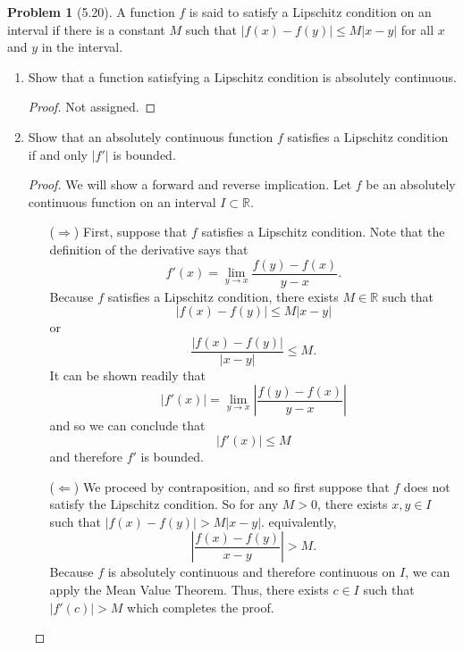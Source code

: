 \documentclass[12pt]{article}
\newcommand{\R}{\mathbb{R}}
\newcommand{\abs}[1]{\left\lvert #1 \right\rvert}
\theoremstyle{definition}
\newtheorem{problem}{Problem}
\begin{document}
\begin{problem}[5.20] 
  A function \( f \) is said to satisfy a Lipschitz condition on an interval if there is a constant \( M \) such that \( \abs{f(x) - f(y)} \leq M \abs{x - y} \) for all \( x \) and \( y \) in the interval. 
  \begin{enumerate}[label = (\alph{*})]
    \item Show that a function satisfying a Lipschitz condition is absolutely continuous. 
      \begin{proof}
        Not assigned.
      \end{proof}
    \item  Show that an absolutely continuous function \( f \) satisfies a Lipschitz condition if and only \( \abs{f'} \) is bounded. 
    
      \begin{proof}
        We will show a forward and reverse implication. Let \( f \) be an absolutely continuous function on an interval \( I \subset \R \).
          \begin{enumerate}
            \item[(\(\Rightarrow\))] First, suppose that \( f \) satisfies a Lipschitz condition.  
            Note that the definition of the derivative says that 
              \[
                  f'(x) = \lim_{y \to x}  \frac{f(y) - f(x)}{y - x}.
              \]
            Because \( f \) satisfies a Lipschitz condition, there exists \( M \in \R \) such that 
              \[
                 \abs{f(x) - f(y)} \leq M \abs{x - y} 
              \]
            or 
              \[
                 \frac{\abs{f(x) - f(y)}}{\abs{x - y}}  \leq M.
              \]
            It can be shown readily that 
              \[
                 \abs{f'(x)} = \lim_{y \to x}  \abs{\frac{f(y) - f(x)}{y - x}}
              \]
            and so we can conclude that 
              \[
                  \abs{f'(x)} \leq M
              \]
            and therefore \( f' \) is bounded.
            \item[(\(\Leftarrow\))] We proceed by contraposition, and so first suppose that \( f \) does not satisfy the Lipschitz condition. So for any \( M > 0\), there exists \( x,y \in I \) such that \( \abs{f(x) - f(y)} > M \abs{x - y} \).
            equivalently, 
              \[  
                  \abs{\frac{f(x) - f(y)}{x - y}}> M.
              \]
            Because \( f \) is absolutely continuous and therefore continuous on \( I \), we can apply the Mean Value Theorem. 
            Thus, there exists \( c \in I \) such that \( \abs{f'(c)} > M \) which completes the proof.
          \end{enumerate}
  
      \end{proof}
  \end{enumerate}
    
\end{problem}
\end{document}
